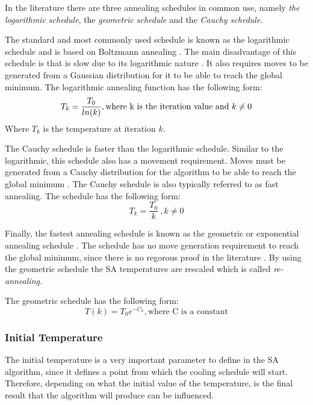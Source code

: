 In the literature there are three annealing schedules in common use, namely \emph{the logarithmic schedule}, the \emph{geometric schedule} and the \emph{Cauchy schedule}\cite{VeryFastSAImageEnchancement,SASingleMultiObj}. 

The standard and most commonly used schedule is known as the logarithmic schedule and is based on Boltzmann annealing \cite{VeryFastSAImageEnchancement}. The main disadvantage of this schedule is that is slow due to its logarithmic nature \cite{VeryFastSAImageEnchancement}. It also requires moves to be generated from a Gaussian distribution for it to be able to reach the global minimum\cite{SASingleMultiObj}. The logarithmic annealing function has the following form:
\begin{equation}
\label{eq:logcooling}
	T_k = \frac{T_0}{ln(k)},\text{where k is the iteration value and } k \neq 0\\
\end{equation}
Where $T_k$ is the temperature at iteration $k$.

The Cauchy schedule is faster than the logarithmic schedule. Similar to the logarithmic, this schedule also has a movement requirement. Moves must be generated from a Cauchy distribution for the algorithm to be able to reach the global minimum \cite{SASingleMultiObj,VeryFastSAImageEnchancement}. The Cauchy schedule is also typically referred to as fast annealing\cite{VeryFastSAImageEnchancement}. The schedule has the following form:
\begin{equation}
\label{eq:cauchycooling}
	T_k = \frac{T_0}{k} ~, k \neq 0
\end{equation}

Finally, the fastest annealing schedule is known as the geometric or exponential annealing schedule \cite{SASingleMultiObj}. The schedule has no move generation requirement to reach the global minimum, since there is no regorous proof in the literature \cite{SASingleMultiObj}. By using the geometric schedule the \gls{SA} temperatures are rescaled which is called \emph{re-annealing}\cite{VeryFastSAImageEnchancement}.

The geometric schedule has the following form:
\begin{equation}
\label{eq:geocooling}
	T(k)=T_0e^{-C_k},\text{where C is a constant}
\end{equation}

\subsubsection{Initial Temperature}
The initial temperature is a very important parameter to define in the \gls{SA} algorithm, since it defines a point from which the cooling schedule will start\cite{VariousCoolingSA}. Therefore, depending on what the initial value of the temperature, is the final result that the algorithm will produce can be influenced\cite{SALongestCommon,AutoConfigSA}.

